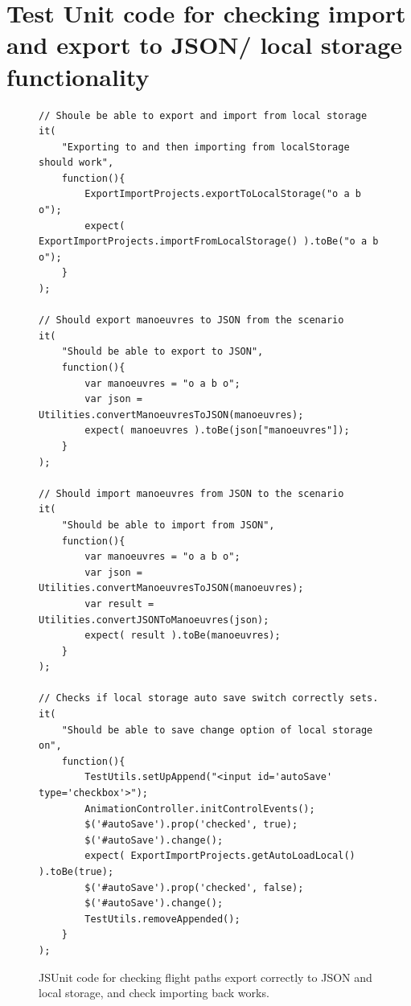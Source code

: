 \section{Test Unit code for checking import and export to JSON/ local storage functionality}
\label{test:save}
\begin{figure}[h!]
\caption{JSUnit code for checking flight paths export correctly to JSON and local storage, and check importing back works.}
\begin{lstlisting}
// Shoule be able to export and import from local storage
it(
    "Exporting to and then importing from localStorage should work",
    function(){
        ExportImportProjects.exportToLocalStorage("o a b o");
        expect( ExportImportProjects.importFromLocalStorage() ).toBe("o a b o");
    }
);

// Should export manoeuvres to JSON from the scenario
it(
    "Should be able to export to JSON",
    function(){
        var manoeuvres = "o a b o";
        var json = Utilities.convertManoeuvresToJSON(manoeuvres);
        expect( manoeuvres ).toBe(json["manoeuvres"]);
    }
);

// Should import manoeuvres from JSON to the scenario
it(
    "Should be able to import from JSON",
    function(){
        var manoeuvres = "o a b o";
        var json = Utilities.convertManoeuvresToJSON(manoeuvres);
        var result = Utilities.convertJSONToManoeuvres(json);
        expect( result ).toBe(manoeuvres);
    }
);

// Checks if local storage auto save switch correctly sets.
it(
    "Should be able to save change option of local storage on",
    function(){
        TestUtils.setUpAppend("<input id='autoSave' type='checkbox'>");
        AnimationController.initControlEvents();
        $('#autoSave').prop('checked', true);
        $('#autoSave').change();
        expect( ExportImportProjects.getAutoLoadLocal() ).toBe(true);
        $('#autoSave').prop('checked', false);
        $('#autoSave').change();
        TestUtils.removeAppended();
    }
);
\end{lstlisting}
\end{figure}

